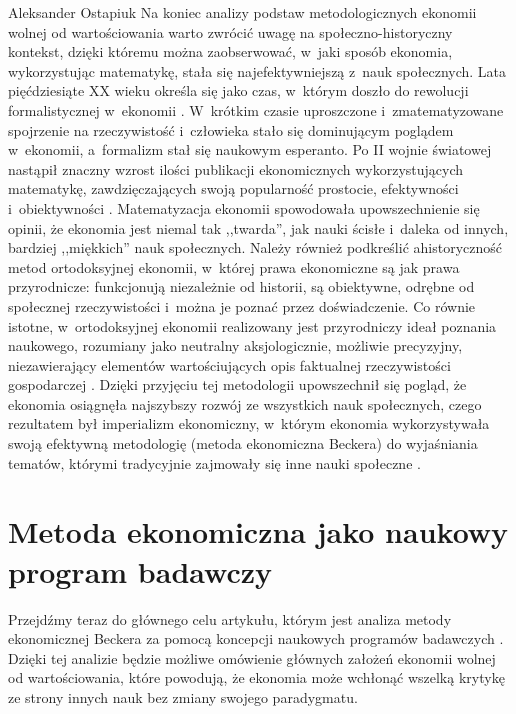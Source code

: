 \begin{artplenv}{Aleksander Ostapiuk}
Na koniec analizy podstaw metodologicznych ekonomii wolnej od wartościowania warto zwrócić uwagę na
społeczno-historyczny kontekst, dzięki któremu można zaobserwować, w~jaki sposób ekonomia, wykorzystując matematykę,
stała się najefektywniejszą z~nauk społecznych. Lata pięćdziesiąte XX wieku określa się jako czas, w~którym doszło do rewolucji
formalistycznej w~ekonomii
\parencite{blaug_formalist_2003}.
W~krótkim czasie uproszczone i~zmatematyzowane
spojrzenie na rzeczywistość i~człowieka stało się dominującym poglądem w~ekonomii, a~formalizm stał się naukowym
esperanto. Po II wojnie światowej nastąpił znaczny wzrost ilości publikacji ekonomicznych wykorzystujących matematykę,
zawdzięczających swoją popularność prostocie, efektywności i~obiektywności
\parencite{debreu_mathematization_1991}.
Matematyzacja ekonomii spowodowała upowszechnienie się opinii, że ekonomia jest niemal tak ,,twarda'', jak nauki
ścisłe i~daleka od innych, bardziej ,,miękkich'' nauk społecznych.
Należy również podkreślić ahistoryczność metod ortodoksyjnej
ekonomii, w~której prawa ekonomiczne są jak prawa przyrodnicze: funkcjonują niezależnie od historii, są obiektywne,
odrębne od społecznej rzeczywistości i~można je poznać przez doświadczenie. Co równie istotne, w~ortodoksyjnej ekonomii
realizowany jest przyrodniczy ideał poznania naukowego, rozumiany jako neutralny aksjologicznie, możliwie precyzyjny,
niezawierający elementów wartościujących opis faktualnej rzeczywistości gospodarczej
\parencite[zob.][]{zboron_dyskurs_2013}.
Dzięki przyjęciu tej metodologii upowszechnił się pogląd, że ekonomia osiągnęła najszybszy rozwój ze
wszystkich nauk społecznych, czego rezultatem był imperializm ekonomiczny, w~którym ekonomia wykorzystywała swoją
efektywną metodologię (metoda ekonomiczna Beckera) do wyjaśniania tematów, którymi tradycyjnie zajmowały się inne nauki
społeczne
\parencite{lazear_economic_2000,maki_economics_2009,maki_scientific_2017}.

\section{Metoda ekonomiczna jako naukowy program badawczy}
Przejdźmy teraz do głównego celu artykułu, którym jest analiza metody ekonomicznej Beckera za pomocą koncepcji
naukowych programów badawczych
\parencite{lakatos_methodology_1980}.
Dzięki tej analizie będzie możliwe omówienie
głównych założeń ekonomii wolnej od wartościowania, które powodują, że ekonomia może wchłonąć wszelką krytykę ze strony
innych nauk bez zmiany swojego paradygmatu. 


\end{artplenv}
